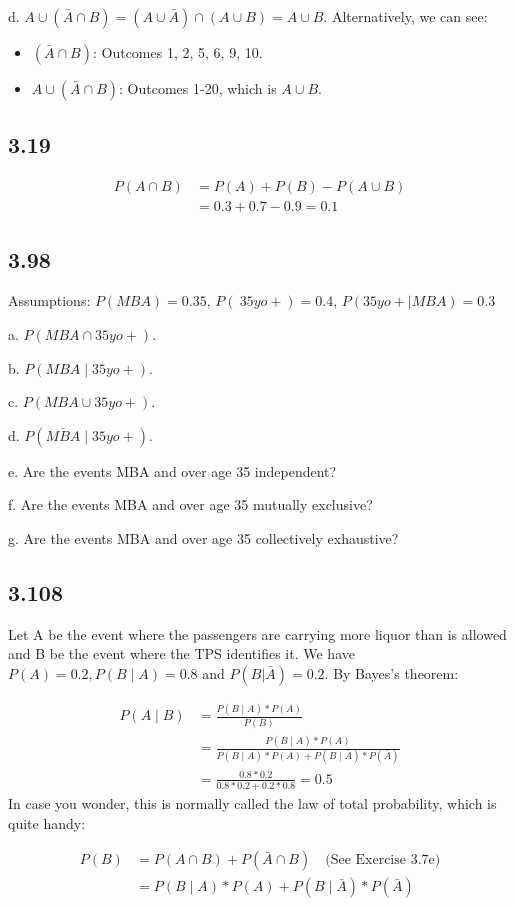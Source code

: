 \documentclass[
]{article}
\begin{document}
d.
\(A \cup (\bar{A} \cap B) = (A \cup \bar{A}) \cap (A \cup B) = A \cup B\).
Alternatively, we can see:

\begin{itemize}
\item
  \((\bar{A} \cap B)\): Outcomes 1, 2, 5, 6, 9, 10.
\item
  \(A \cup (\bar{A} \cap B)\): Outcomes 1-20, which is \(A \cup B\).
\end{itemize}

\hypertarget{section-5}{%
\subsection{3.19}\label{section-5}}

\[\begin{align*}
P( A \cap B) &= P(A) + P(B) - P(A \cup B) \\ &= 0.3 + 0.7 - 0.9 = 0.1
\end{align*}\]

\hypertarget{section-6}{%
\subsection{3.98}\label{section-6}}

Assumptions: \(P(MBA) = 0.35\), \(P(\>35 yo+) = 0.4\),
\(P(35yo+ \mid MBA) = 0.3\)

a. \(P(MBA \cap 35yo+)\).

b. \(P(MBA \mid 35yo+)\).

c. \(P(MBA \cup 35yo+)\).

d. \(P(\bar{MBA} \mid 35yo+)\).

e. Are the events MBA and over age 35 independent?

f. Are the events MBA and over age 35 mutually exclusive?

g. Are the events MBA and over age 35 collectively exhaustive?

\hypertarget{section-7}{%
\subsection{3.108}\label{section-7}}

Let A be the event where the passengers are carrying more liquor than is
allowed and B be the event where the TPS identifies it. We have
\(P(A) = 0.2, P(B \mid A) = 0.8\) and \(P(B|\bar{A}) = 0.2\). By Bayes's
theorem:

\[\begin{align*}
P(A \mid B)
& = \frac{P(B \mid A) * P(A)}{P(B)} \\
& = \frac{P(B \mid A)*P(A)}{P(B \mid A)*P(A) + P(B \mid \bar{A})*P(\bar{A})} \\
& = \frac{0.8*0.2}{0.8*0.2 + 0.2*0.8} = 0.5
\end{align*}\] In case you wonder, this is normally called the law of
total probability, which is quite handy:

\[\begin{align*}
P(B) & = P(A \cap B) + P(\bar{A} \cap B) \quad \text{(See Exercise 3.7e)}\\
& = P(B \mid A)*P(A) + P(B \mid \bar{A})*P(\bar{A})
\end{align*}\]
\end{document}
